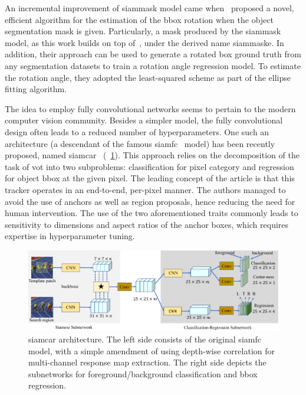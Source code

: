 An incremental improvement of \gls{siammask} model came when~\cite{chen2019rotbboxes} proposed a novel, efficient algorithm for the estimation of the \gls{bbox} rotation when the object segmentation mask is given. Particularly, a mask produced by the \gls{siammask} model, as this work builds on top of~\cite{wang2019siammask}, under the derived name \gls{siammaske}. In addition, their approach can be used to generate a rotated box ground truth from any segmentation datasets to train a rotation angle regression model. To estimate the rotation angle, they adopted the least-squared scheme as part of the ellipse fitting algorithm.

The idea to employ fully convolutional networks seems to pertain to the modern computer vision community. Besides a simpler model, the fully convolutional design often leads to a reduced number of hyperparameters. One such an architecture (a descendant of the famous \gls{siamfc}~\cite{bertinetto2016siamfc} model) has been recently proposed, named \gls{siamcar}~\cite{guo2019siamcar} (\figtext{}~\ref{fig:SiamCARArchitecture}). This approach relies on the decomposition of the task of \gls{vot} into two subproblems: classification for pixel category and regression for object \gls{bbox} at the given pixel. The leading concept of the article is that this tracker operates in an end-to-end, per-pixel manner. The authors managed to avoid the use of anchors as well as region proposals, hence reducing the need for human intervention. The use of the two aforementioned traits commonly leads to sensitivity to dimensions and aspect ratios of the anchor boxes, which requires expertise in hyperparameter tuning.

\begin{figure}[t]
    \centerline{\includegraphics[width=\linewidth]{figures/theoretical_foundations/siamcar_architecture.pdf}}
    \caption[\gls{siamcar} architecture]{\gls{siamcar} architecture. The left side consists of the original \gls{siamfc}~\cite{bertinetto2016siamfc} model, with a simple amendment of using depth-wise correlation for multi-channel response map extraction. The right side depicts the subnetworks for foreground/background classification and \gls{bbox} regression. }
    \label{fig:SiamCARArchitecture}
\end{figure}


